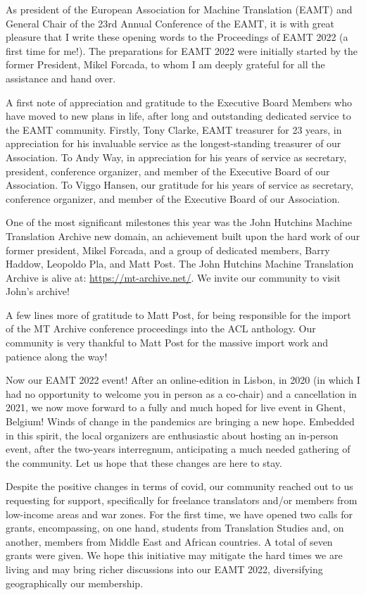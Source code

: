 \documentclass[a4paper,11pt,twoside]{book}
\begin{document}
\begin{onehalfspacing}
As president of the European Association for Machine Translation (EAMT) and General Chair of the 23rd Annual Conference of the EAMT, it is with great pleasure that I write these opening words to the Proceedings of EAMT 2022 (a first time for me!). The preparations for EAMT 2022 were initially started by the former President, Mikel Forcada, to whom I am deeply grateful for all the assistance and hand over.

A first note of appreciation and gratitude to the Executive Board Members who have moved to new plans in life, after long and outstanding dedicated service to the EAMT community. Firstly, Tony Clarke, EAMT treasurer for 23 years, in appreciation for his invaluable service as the longest-standing treasurer of our Association. To Andy Way, in appreciation for his years of service as secretary, president, conference organizer, and member of the Executive Board of our Association. To Viggo Hansen, our gratitude for his years of service as secretary, conference organizer, and member of the Executive Board of our Association. 

One of the most significant milestones this year was the John Hutchins Machine Translation Archive new domain, an achievement built upon the hard work of our former president, Mikel Forcada, and a group of dedicated members, Barry Haddow, Leopoldo Pla, and Matt Post. The John Hutchins Machine Translation Archive is alive at: \url{https://mt-archive.net/}. We invite our community to visit John's archive!

A few lines more of gratitude to Matt Post, for being responsible for the import of the MT Archive conference proceedings into the ACL anthology. Our community is very thankful to Matt Post for the massive import work and patience along the way!

Now our EAMT 2022 event! After an online-edition in Lisbon, in 2020 (in which I had no opportunity to welcome you in person as a co-chair) and a cancellation in 2021, we now move forward to a fully and much hoped for live event in Ghent, Belgium! Winds of change in the pandemics are bringing a new hope. Embedded in this spirit, the local organizers are enthusiastic about hosting an in-person event, after the two-years interregnum, anticipating a much needed gathering of the community. Let us hope that these changes are here to stay. 

Despite the positive changes in terms of covid, our community reached out to us requesting for support, specifically for freelance translators and/or members from low-income areas and war zones. For the first time, we have opened two calls for grants, encompassing, on one hand, students from Translation Studies and, on another, members from Middle East and African countries. A total of seven grants were given. We hope this initiative may mitigate the hard times we are living and may bring richer discussions into our EAMT 2022, diversifying geographically our membership.


\end{onehalfspacing}
\end{document}
